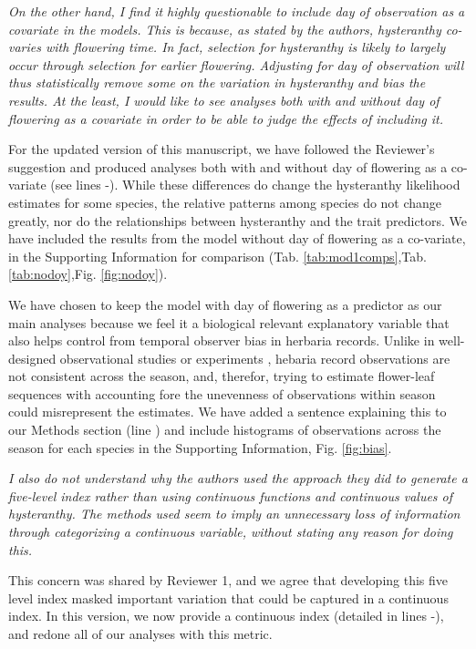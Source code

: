 \documentclass{article}[12pt]
\begin{document}
\emph{On the other hand, I find it highly questionable to include day of observation as a covariate in the models. This is because, as stated by the authors, hysteranthy co-varies with flowering time. In fact, selection for hysteranthy is likely to largely occur through selection for earlier flowering. Adjusting for day of observation will thus statistically remove some on the variation in hysteranthy and bias the results. At the least, I would like to see analyses both with and without day of flowering as a covariate in order to be able to judge the effects of including it.}

For the updated version of this manuscript, we  have followed the Reviewer's suggestion and produced analyses both with and without day of flowering as a co-variate (see lines -). While these differences do change the hysteranthy likelihood estimates for some species, the relative patterns among species do not change greatly, nor do the relationships between hysteranthy and the trait predictors. We have included the results from the model without day of flowering as a co-variate, in the Supporting Information for comparison (Tab. \ref{tab:mod1comps},Tab. \ref{tab:nodoy},Fig. \ref{fig:nodoy}).

We have chosen to keep the model with day of flowering as a predictor as our main analyses because we feel it a biological relevant explanatory variable that also helps control from temporal observer bias in herbaria records. Unlike in well-designed observational studies or experiments , hebaria record observations are not consistent across the season, and, therefor, trying to estimate flower-leaf sequences with accounting fore the unevenness of observations within season could misrepresent the estimates. We have added a sentence explaining this to our Methods section (line ) and include histograms of observations across the season for each species in the Supporting Information, Fig. \ref{fig:bias}.


\emph{I also do not understand why the authors used the approach they did to generate a five-level index rather than using continuous functions and continuous values of hysteranthy. The methods used seem to imply an unnecessary loss of information through categorizing a continuous variable, without stating any reason for doing this.}

This concern was shared by Reviewer 1, and we agree that developing this five level index masked important variation that could be captured in a continuous index. In this version, we now provide a continuous index (detailed in lines -), and redone all of our analyses with this metric.
\end{document}
